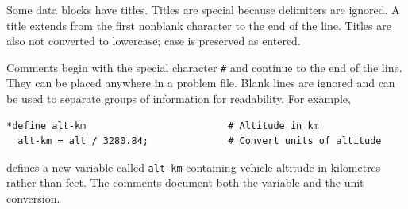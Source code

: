 
Some data blocks have titles. Titles are special because delimiters are ignored. A
title extends from the first nonblank character to the end of the line. Titles are also
not converted to lowercase; case is preserved as entered.


Comments begin with the special character \texttt{\#} and continue to the end of the
line. They can be placed anywhere in a problem file. Blank lines are ignored and can
be used to separate groups of information for readability. For example,

\begin{lstlisting}[style=taosmanual]
*define alt-km                         # Altitude in km
  alt-km = alt / 3280.84;              # Convert units of altitude
\end{lstlisting}

defines a new variable called \texttt{alt-km} containing vehicle altitude in
kilometres rather than feet. The comments document both the variable and the unit
conversion.
